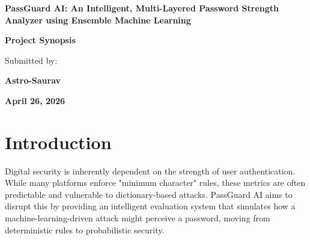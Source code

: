 \documentclass[12pt,a4paper]{article}
\begin{document}
\begin{titlepage}
    \centering
    \vspace*{2cm}
    {\huge \textbf{PassGuard AI: An Intelligent, Multi-Layered Password Strength Analyzer using Ensemble Machine Learning} \par}
    \vspace{2cm}
    {\Large \textbf{Project Synopsis} \par}
    \vspace{1.5cm}
    {\large Submitted by: \par}
    {\Large \textbf{Astro-Saurav} \par}
    \vfill
    {\large \textbf{April 26, 2026} \par}
    \vspace{1cm}
\end{titlepage}

\begin{abstract}
As cyber threats evolve, traditional password meters based on static rules fail to capture the complexity of modern brute-force and dictionary attacks. PassGuard AI introduces a sophisticated approach to password security by leveraging a 12-feature extraction pipeline and an Ensemble Machine Learning architecture. This project provides a full-stack solution featuring a FastAPI backend and a high-fidelity dashboard to deliver real-time, non-deterministic password analysis with actionable security intelligence.
\end{abstract}

\newpage
\tableofcontents
\newpage

\section{Introduction}
Digital security is inherently dependent on the strength of user authentication. While many platforms enforce "minimum character" rules, these metrics are often predictable and vulnerable to dictionary-based attacks. PassGuard AI aims to disrupt this by providing an intelligent evaluation system that simulates how a machine-learning-driven attack might perceive a password, moving from deterministic rules to probabilistic security.

\end{document}
